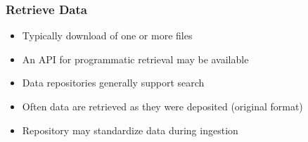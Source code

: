 \documentclass{beamer}
\begin{document}
{
	\begin{frame}[plain]
	\end{frame}
}

\begin{frame}
  \frametitle{Retrieve Data}
  
  \begin{itemize}
  \item Typically download of one or more files
  \item An API for programmatic retrieval may be available
  \item Data repositories generally support search
  \item Often data are retrieved as they were deposited (original format)
  \item Repository may standardize data during ingestion
  \end{itemize}
\end{frame}
\end{document}
